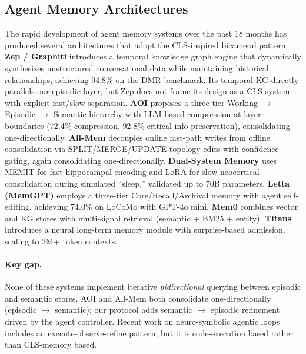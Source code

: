 \documentclass{article}
\begin{document}
\subsection{Agent Memory Architectures}
The rapid development of agent memory systems over the past 18 months has produced
several architectures that adopt the CLS-inspired bicameral pattern. \textbf{Zep /
Graphiti} \citep{zep2025} introduces a temporal knowledge graph engine that
dynamically synthesizes unstructured conversational data while maintaining
historical relationships, achieving 94.8\% on the DMR benchmark. Its temporal KG
directly parallels our episodic layer, but Zep does not frame its design as a CLS
system with explicit fast/slow separation. \textbf{AOI} \citep{aoi2025} proposes a
three-tier Working $\rightarrow$ Episodic $\rightarrow$ Semantic hierarchy with
LLM-based compression at layer boundaries (72.4\% compression, 92.8\% critical info
preservation), consolidating one-directionally. \textbf{All-Mem} \citep{allmem2026}
decouples online fast-path writes from offline consolidation via
SPLIT/MERGE/UPDATE topology edits with confidence gating, again consolidating
one-directionally. \textbf{Dual-System Memory} \citep{dualsystem2026} uses MEMIT for
fast hippocampal encoding and LoRA for slow neocortical consolidation during
simulated ``sleep,'' validated up to 70B parameters. \textbf{Letta (MemGPT)}
\citep{letta2024} employs a three-tier Core/Recall/Archival memory with agent
self-editing, achieving 74.0\% on LoCoMo with GPT-4o mini. \textbf{Mem0}
\citep{mem0} combines vector and KG stores with multi-signal retrieval (semantic +
BM25 + entity). \textbf{Titans} \citep{titans2025} introduces a neural long-term
memory module with surprise-based admission, scaling to 2M+ token contexts.

\paragraph{Key gap.}
None of these systems implement iterative \emph{bidirectional} querying between
episodic and semantic stores. AOI and All-Mem both consolidate one-directionally
(episodic $\rightarrow$ semantic); our protocol adds semantic $\rightarrow$
episodic refinement driven by the agent controller. Recent work on neuro-symbolic
agentic loops \citep{agriworld2026} includes an execute-observe-refine pattern, but
it is code-execution based rather than CLS-memory based.
\end{document}
